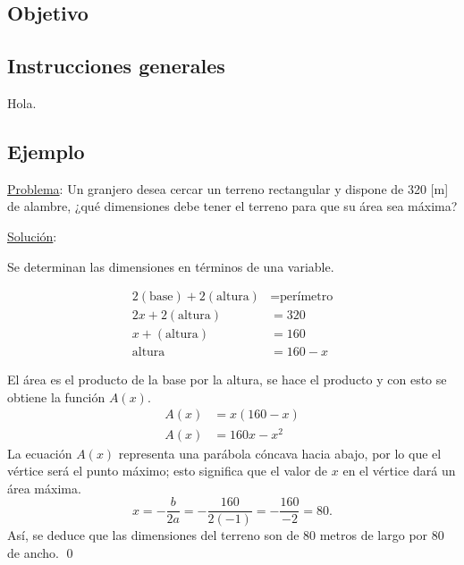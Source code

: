 \documentclass[]{srs2}
\begin{document}
\subsection*{Objetivo}

\subsection*{Instrucciones generales}
Hola.

\subsection*{Ejemplo}

\underline{Problema}: Un granjero desea cercar un terreno rectangular y dispone de
320 [m] de alambre, ¿qué dimensiones debe tener el terreno para que
su área sea máxima?

\underline{Solución}:

Se determinan las dimensiones en términos de una variable.
\begin{columnas}[0.6]
\begin{align*}
  2\left(\text{base}\right) + 2\left(\text{altura}\right) &= \text{perímetro} \\
  2x + 2\left(\text{altura}\right) &= 320 \\
  x + \left(\text{altura}\right) &= 160 \\
  \text{altura} &= 160 - x
\end{align*}
\siguiente
{}
\end{columnas}
El área es el producto de la base por la altura, se hace el producto y con
esto se obtiene la función \(A\left(x\right)\).
\begin{align*}
    A\left(x\right) &= x(160-x) \\
    A\left(x\right) &= 160x - x^2
\end{align*}
La ecuación \(A\left(x\right)\) representa una parábola cóncava hacia
abajo, por lo que el vértice será el punto máximo; esto significa que
el valor de \(x\) en el vértice dará un área máxima.
\begin{equation*}
x = -\dfrac{b}{2a} = - \dfrac{160}{2\left(-1\right)} = -\dfrac{160}{-2} = 80.
\end{equation*}
Así, se deduce que las dimensiones del terreno son de 80 metros
de largo por 80 de ancho. \qed
\end{document}
